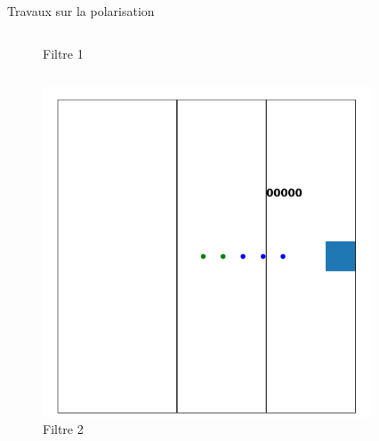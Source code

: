 \documentclass[french]{beamer}
\begin{document}
\begin{frame}{Travaux sur la polarisation}
\begin{columns}
\begin{column}{0.5\textwidth}
\begin{figure}
                \caption{\small Filtre 1}
            \end{figure}
        \end{column}
    \end{columns}
    \begin{columns}
        \begin{column}{0.5\textwidth}
            \begin{figure}
                \captionsetup{labelformat=empty}
                \includegraphics[scale=0.05]{Filtre2.png}
                \caption{\small Filtre 2}
            \end{figure}
        \end{column}
        \begin{column}{0.5\textwidth}
            \begin{figure}
                \captionsetup{labelformat=empty}

\end{figure}
\end{column}
\end{columns}
\end{frame}
\end{document}
